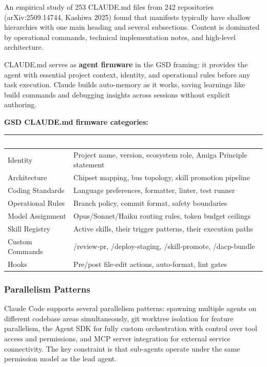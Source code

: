 \documentclass[11pt,letterpaper]{article}
\newcommand{\tableheader}[1]{\textbf{\sffamily\textcolor{white}{#1}}}
\begin{document}
An empirical study of 253 CLAUDE.md files from 242 repositories (arXiv:2509.14744, Kashiwa 2025) found that manifests typically have shallow hierarchies with one main heading and several subsections. Content is dominated by operational commands, technical implementation notes, and high-level architecture.

CLAUDE.md serves as \textbf{agent firmware} in the GSD framing: it provides the agent with essential project context, identity, and operational rules before any task execution. Claude builds auto-memory as it works, saving learnings like build commands and debugging insights across sessions without explicit authoring.

\textbf{GSD CLAUDE.md firmware categories:}
\begin{center}
\begin{tabularx}{\textwidth}{L{4cm}X}
\toprule
{}
\tableheader{Category} & \tableheader{Contents} \\
\midrule
Identity & Project name, version, ecosystem role, Amiga Principle statement \\
Architecture & Chipset mapping, bus topology, skill promotion pipeline \\
Coding Standards & Language preferences, formatter, linter, test runner \\
Operational Rules & Branch policy, commit format, safety boundaries \\
Model Assignment & Opus/Sonnet/Haiku routing rules, token budget ceilings \\
Skill Registry & Active skills, their trigger patterns, their execution paths \\
Custom Commands & /review-pr, /deploy-staging, /skill-promote, /dacp-bundle \\
Hooks & Pre/post file-edit actions, auto-format, lint gates \\
\bottomrule
\end{tabularx}
\end{center}

\subsubsection{Parallelism Patterns}

Claude Code supports several parallelism patterns: spawning multiple agents on different codebase areas simultaneously, git worktree isolation for feature parallelism, the Agent SDK for fully custom orchestration with control over tool access and permissions, and MCP server integration for external service connectivity. The key constraint is that sub-agents operate under the same permission model as the lead agent.
\end{document}
